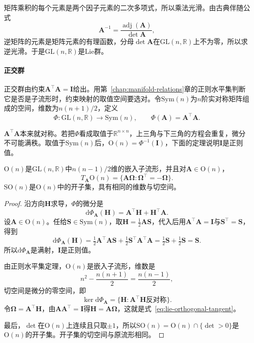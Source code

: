 矩阵乘积的每个元素是两个因子元素的二次多项式，所以乘法光滑。由古典伴随公式
\[
\bm A^{-1}=\frac{\operatorname{adj}(\bm A)}{\det\bm A},
\]
逆矩阵的元素是矩阵元素的有理函数，分母$\det\bm A$在$\mathrm{GL}(n,\mathbb R)$上不为零，所以求逆光滑。于是$\mathrm{GL}(n,\mathbb R)$是Lie群。

\paragraph{正交群}
正交群由约束$\bm A^\top\bm A=\bm I$给出。用第~\ref{chap:manifold-relations}章的正则水平集判断它是否是子流形时，约束映射的取值空间要选对。令$\mathrm{Sym}(n)$为$n$阶实对称矩阵组成的空间，维数为$n(n+1)/2$，定义
\[
\Phi:\mathrm{GL}(n,\mathbb R)\to\mathrm{Sym}(n),\qquad \Phi(\bm A)=\bm A^\top\bm A.
\]

$\bm A^\top\bm A$本来就对称。若把$\Phi$看成取值于$\mathbb R^{n\times n}$，上三角与下三角的方程会重复，微分不可能满秩。取值于$\mathrm{Sym}(n)$后，$\mathrm O(n)=\Phi^{-1}(\bm I)$，下面的定理说明$\bm I$是正则值。

\begin{theorem}[正交群的流形结构]
\label{thm:lie-orthogonal-group-manifold}
$\mathrm O(n)$是$\mathrm{GL}(n,\mathbb R)$中$n(n-1)/2$维的嵌入子流形，并且对$\bm A\in\mathrm O(n)$，
\begin{equation}
 T_{\bm A}\mathrm O(n)=\{\bm A\bm\Omega:\bm\Omega^\top=-\bm\Omega\}.
 \label{eq:lie-orthogonal-tangent}
\end{equation}
$\mathrm{SO}(n)$是$\mathrm O(n)$中的开子集，具有相同的维数与切空间。
\end{theorem}

\begin{proof}
沿方向$\bm H$求导，$\Phi$的微分是
\[
\mathrm d\Phi_{\bm A}(\bm H)=\bm A^\top\bm H+\bm H^\top\bm A.
\]
设$\bm A\in\mathrm O(n)$。任给$\bm S\in\mathrm{Sym}(n)$，取$\bm H=\frac12\bm A\bm S$，代入后用$\bm A^\top\bm A=\bm I$与$\bm S^\top=\bm S$，得到
\[
\mathrm d\Phi_{\bm A}(\bm H)
=\tfrac12\bm A^\top\bm A\bm S+\tfrac12\bm S^\top\bm A^\top\bm A
=\tfrac12\bm S+\tfrac12\bm S=\bm S.
\]
所以$\mathrm d\Phi_{\bm A}$是满射，$\bm I$是正则值。

由正则水平集定理，$\mathrm O(n)$是嵌入子流形，维数是
\[
n^2-\frac{n(n+1)}2=\frac{n(n-1)}2,
\]
切空间是微分的零空间，即
\[
\ker\mathrm d\Phi_{\bm A}=\{\bm H:\bm A^\top\bm H\text{反对称}\}.
\]
令$\bm\Omega=\bm A^\top\bm H$，由$\bm A\bm A^\top=\bm I$得$\bm H=\bm A\bm\Omega$，这就是式~\eqref{eq:lie-orthogonal-tangent}。

最后，$\det$在$\mathrm O(n)$上连续且只取$\pm1$，所以$\mathrm{SO}(n)=\mathrm O(n)\cap\{\det>0\}$是$\mathrm O(n)$的开子集。开子集的切空间与原流形相同。
\end{proof}

